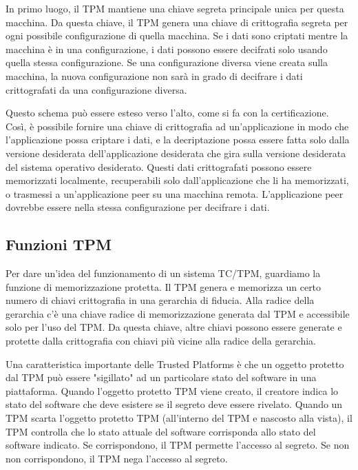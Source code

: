 \singlespacing

In primo luogo, il TPM mantiene una chiave segreta principale unica per questa macchina. Da questa chiave, il TPM genera una chiave di crittografia segreta per ogni possibile configurazione di quella macchina. Se i dati sono criptati mentre la macchina è in una configurazione, i dati possono essere decifrati solo usando quella stessa configurazione. Se una configurazione diversa viene creata sulla macchina, la nuova configurazione non sarà in grado di decifrare i dati crittografati da una configurazione diversa.

\singlespacing

Questo schema può essere esteso verso l'alto, come si fa con la certificazione. Così, è possibile fornire una chiave di crittografia ad un'applicazione in modo che l'applicazione possa criptare i dati, e la decriptazione possa essere fatta solo dalla versione desiderata dell'applicazione desiderata che gira sulla versione desiderata del sistema operativo desiderato. Questi dati crittografati possono essere memorizzati localmente, recuperabili solo dall'applicazione che li ha memorizzati, o trasmessi a un'applicazione peer su una macchina remota. L'applicazione peer dovrebbe essere nella stessa configurazione per decifrare i dati.

\newpage
\subsection{Funzioni TPM}
Per dare un'idea del funzionamento di un sistema TC/TPM, guardiamo la funzione di memorizzazione protetta. Il TPM genera e memorizza un certo numero di chiavi crittografia in una gerarchia di fiducia. Alla radice della gerarchia c'è una chiave radice di memorizzazione generata dal TPM e accessibile solo per l'uso del TPM. Da questa chiave, altre chiavi possono essere generate e protette dalla crittografia con chiavi più vicine alla radice della gerarchia.

Una caratteristica importante delle Trusted Platforms è che un oggetto protetto dal TPM può essere "sigillato" ad un particolare stato del software in una piattaforma. Quando l'oggetto protetto TPM viene creato, il creatore indica lo stato del software che deve esistere se il segreto deve essere rivelato. Quando un TPM scarta l'oggetto protetto TPM (all'interno del TPM e nascosto alla vista), il TPM controlla che lo stato attuale del software corrisponda allo stato del software indicato. Se corrispondono, il TPM permette l'accesso al segreto. Se non non corrispondono, il TPM nega l'accesso al segreto.

